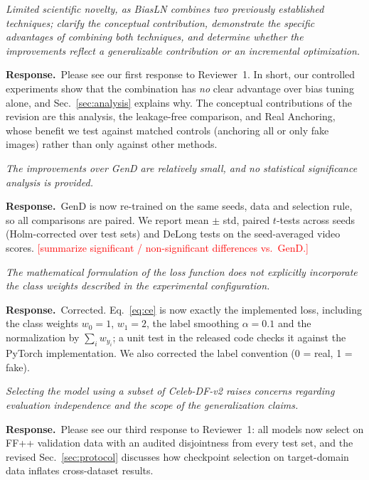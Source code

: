 \documentclass[11pt]{article}
\newif\ifpending\pendingtrue
\newcommand{\pending}[1]{\ifpending\textcolor{red}{[#1]}\else\errmessage{pending: #1}\fi}
\newenvironment{comment}{\par\medskip\noindent\begin{minipage}{\linewidth}\color{black!70}\itshape}{\end{minipage}\par\smallskip}
\newcommand{\resp}{\noindent\textbf{Response.}~}
\begin{document}
\begin{comment}
Limited scientific novelty, as BiasLN combines two previously established techniques; clarify the conceptual contribution, demonstrate the specific advantages of combining both techniques, and determine whether the improvements reflect a generalizable contribution or an incremental optimization.
\end{comment}
\resp Please see our first response to Reviewer~1. In short, our controlled experiments show that the combination has \emph{no} clear advantage over bias tuning alone, and Sec.~\ref{sec:analysis} explains why. The conceptual contributions of the revision are this analysis, the leakage-free comparison, and Real Anchoring, whose benefit we test against matched controls (anchoring all or only fake images) rather than only against other methods.

\begin{comment}
The improvements over GenD are relatively small, and no statistical significance analysis is provided.
\end{comment}
\resp GenD is now re-trained on the same seeds, data and selection rule, so all comparisons are paired. We report mean $\pm$ std, paired $t$-tests across seeds (Holm-corrected over test sets) and DeLong tests on the seed-averaged video scores. \pending{summarize significant / non-significant differences vs.\ GenD.}

\begin{comment}
The mathematical formulation of the loss function does not explicitly incorporate the class weights described in the experimental configuration.
\end{comment}
\resp Corrected. Eq.~\eqref{eq:ce} is now exactly the implemented loss, including the class weights $w_0=1$, $w_1=2$, the label smoothing $\alpha=0.1$ and the normalization by $\sum_i w_{y_i}$; a unit test in the released code checks it against the PyTorch implementation. We also corrected the label convention (0 = real, 1 = fake).

\begin{comment}
Selecting the model using a subset of Celeb-DF-v2 raises concerns regarding evaluation independence and the scope of the generalization claims.
\end{comment}
\resp Please see our third response to Reviewer~1: all models now select on FF++ validation data with an audited disjointness from every test set, and the revised Sec.~\ref{sec:protocol} discusses how checkpoint selection on target-domain data inflates cross-dataset results.
\end{document}
